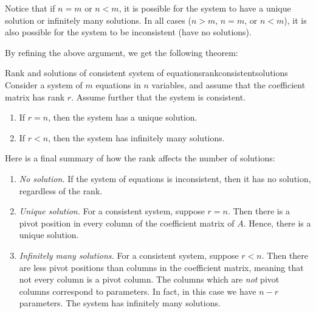 Notice that if $n=m$ or $n<m$, it is possible for the system to have a
unique solution or infinitely many solutions. In all cases ($n>m$,
$n=m$, or $n<m$), it is also possible for the system to be
inconsistent (have no solutions).

By refining the above argument, we get the following theorem:

\begin{theorem}{Rank and solutions of consistent system of equations}{rankconsistentsolutions}
  Consider a system of $m$ equations in $n$ variables, and assume that
  the coefficient matrix has rank $r$. Assume further that the system
  is consistent.
\begin{enumerate}
\item If $r=n$, then the system has a unique solution.
\item If $r<n$, then the system has infinitely many solutions.
\end{enumerate}
\end{theorem}

Here is a final summary of how the rank affects the number of
solutions:

\begin{enumerate}
\item {\em No solution.} If the system of equations is inconsistent,
  then it has no solution, regardless of the rank.

\item {\em Unique solution.} For a consistent system, suppose
  $r=n$. Then there is a pivot position in every column of the
  coefficient matrix of $A$. Hence, there is a unique solution.

\item {\em Infinitely many solutions.} For a consistent system, suppose
  $r<n$. Then there are less pivot positions than columns in the
  coefficient matrix, meaning that not every column is a pivot
  column. The columns which are {\em not} pivot columns correspond to
  parameters. In fact, in this case we have $n-r$ parameters. The
  system has infinitely many solutions.
\end{enumerate}
